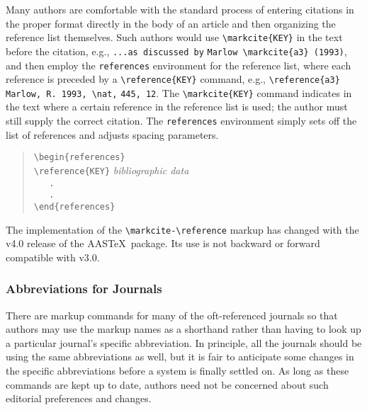 Many authors are comfortable with the standard
process of entering citations in the proper format directly
in the body of an article and then organizing the reference
list themselves.
Such authors would use \verb"\markcite{KEY}" in the text before the citation,
e.g., \verb"...as discussed by" \verb"Marlow \markcite{a3} (1993)",
and then employ the {\tt references} environment for the
reference list, where each reference is preceded by a \verb"\reference{KEY}" 
command, e.g., \verb"\reference{a3} Marlow, R. 1993, \nat," \verb"445, 12". 
The \verb"\markcite{KEY}" command indicates in the text where a certain 
reference in the reference list is used; the author must still supply the 
correct citation.
The {\tt references} environment simply sets off
the list of references and adjusts spacing parameters.
\begin{quote}
\verb"\begin{references}"\\
\verb"\reference{KEY}" {\it bibliographic data\/}\\
\verb"   ."\\
\verb"   ."\\
\verb"\end{references}"
\end{quote}

The implementation of the \verb"\markcite-\reference" markup has changed
with the v4.0 release of the AAS\TeX\ package.  Its use is not backward
or forward compatible with v3.0. 

\subsubsection{Abbreviations for Journals}

There are markup commands for many of the oft-referenced journals so that
authors may use the markup names as a shorthand rather than having to look
up a particular journal's specific abbreviation.
In principle, all the journals should be using the
same abbreviations as well, but it is fair to anticipate some changes in the
specific abbreviations before a system is finally settled on.  As long as
these commands are kept up to date, authors need not be concerned about
such editorial preferences and changes.


